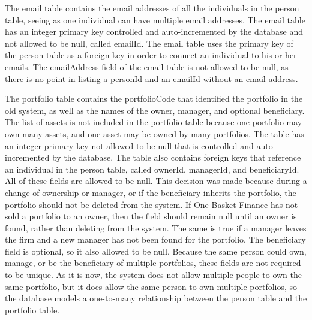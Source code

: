 \documentclass[12pt]{scrartcl} %
\begin{document}
    The email table contains the email addresses of all the individuals in the person table, seeing as one individual can have multiple email addresses.  The email table has an integer primary key controlled and auto-incremented by the database and not allowed to be null, called emailId.  The email table uses the primary key of the person table as a foreign key in order to connect an individual to his or her emails.  The emailAddress field of the email table is not allowed to be null, as there is no point in listing a personId and an emailId without an email address.

    The portfolio table contains the portfolioCode that identified the portfolio in the old system, as well as the names of the owner, manager, and optional beneficiary.  The list of assets is not included in the portfolio table because one portfolio may own many assets, and one asset may be owned by many portfolios.  The table has an integer primary key not allowed to be null that is controlled and auto-incremented by the database.  The table also contains foreign keys that reference an individual in the person table, called ownerId, managerId, and beneficiaryId.  All of these fields are allowed to be null.  This decision was made because during a change of ownership or manager, or if the beneficiary inherits the portfolio, the portfolio should not be deleted from the system.  If One Basket Finance has not sold a portfolio to an owner, then the field should remain null until an owner is found, rather than deleting from the system.  The same is true if a manager leaves the firm and a new manager has not been found for the portfolio.  The beneficiary field is optional, so it also allowed to be null.  Because the same person could own, manage, or be the beneficiary of multiple portfolios, these fields are not required to be unique.  As it is now, the system does not allow multiple people to own the same portfolio, but it does allow the same person to own multiple portfolios, so the database models a one-to-many relationship between the person table and the portfolio table.
\end{document}
